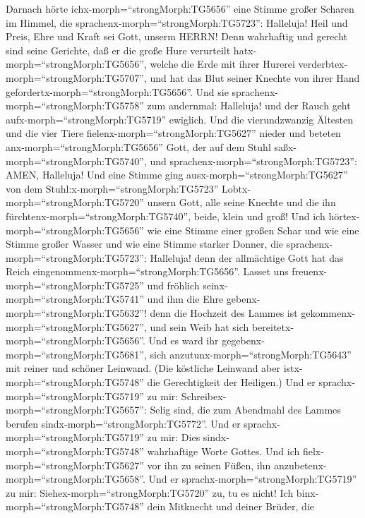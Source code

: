  Darnach hörte ichx-morph=``strongMorph:TG5656'' eine Stimme
großer Scharen im Himmel, die sprachenx-morph=``strongMorph:TG5723'':
Halleluja! Heil und Preis, Ehre und Kraft sei Gott, unserm HERRN!
 Denn wahrhaftig und gerecht sind seine Gerichte, daß er die
große Hure verurteilt hatx-morph=``strongMorph:TG5656'', welche die Erde
mit ihrer Hurerei verderbtex-morph=``strongMorph:TG5707'', und hat das
Blut seiner Knechte von ihrer Hand
gefordertx-morph=``strongMorph:TG5656''.  Und sie
sprachenx-morph=``strongMorph:TG5758'' zum andernmal: Halleluja! und der
Rauch geht aufx-morph=``strongMorph:TG5719'' ewiglich.  Und
die vierundzwanzig Ältesten und die vier Tiere
fielenx-morph=``strongMorph:TG5627'' nieder und beteten
anx-morph=``strongMorph:TG5656'' Gott, der auf dem Stuhl
saßx-morph=``strongMorph:TG5740'', und
sprachenx-morph=``strongMorph:TG5723'': AMEN, Halleluja! 
Und eine Stimme ging ausx-morph=``strongMorph:TG5627'' von dem
Stuhl:x-morph=``strongMorph:TG5723'' Lobtx-morph=``strongMorph:TG5720''
unsern Gott, alle seine Knechte und die ihn
fürchtenx-morph=``strongMorph:TG5740'', beide, klein und groß!
 Und ich hörtex-morph=``strongMorph:TG5656'' wie eine Stimme
einer großen Schar und wie eine Stimme großer Wasser und wie eine Stimme
starker Donner, die sprachenx-morph=``strongMorph:TG5723'': Halleluja!
denn der allmächtige Gott hat das Reich
eingenommenx-morph=``strongMorph:TG5656''.  Lasset uns
freuenx-morph=``strongMorph:TG5725'' und fröhlich
seinx-morph=``strongMorph:TG5741'' und ihm die Ehre
gebenx-morph=``strongMorph:TG5632''! denn die Hochzeit des Lammes ist
gekommenx-morph=``strongMorph:TG5627'', und sein Weib hat sich
bereitetx-morph=``strongMorph:TG5656''.  Und es ward ihr
gegebenx-morph=``strongMorph:TG5681'', sich
anzutunx-morph=``strongMorph:TG5643'' mit reiner und schöner Leinwand.
(Die köstliche Leinwand aber istx-morph=``strongMorph:TG5748'' die
Gerechtigkeit der Heiligen.)  Und er
sprachx-morph=``strongMorph:TG5719'' zu mir:
Schreibex-morph=``strongMorph:TG5657'': Selig sind, die zum Abendmahl
des Lammes berufen sindx-morph=``strongMorph:TG5772''. Und er
sprachx-morph=``strongMorph:TG5719'' zu mir: Dies
sindx-morph=``strongMorph:TG5748'' wahrhaftige Worte Gottes.
 Und ich fielx-morph=``strongMorph:TG5627'' vor ihn zu
seinen Füßen, ihn anzubetenx-morph=``strongMorph:TG5658''. Und er
sprachx-morph=``strongMorph:TG5719'' zu mir:
Siehex-morph=``strongMorph:TG5720'' zu, tu es nicht! Ich
binx-morph=``strongMorph:TG5748'' dein Mitknecht und deiner Brüder, die
